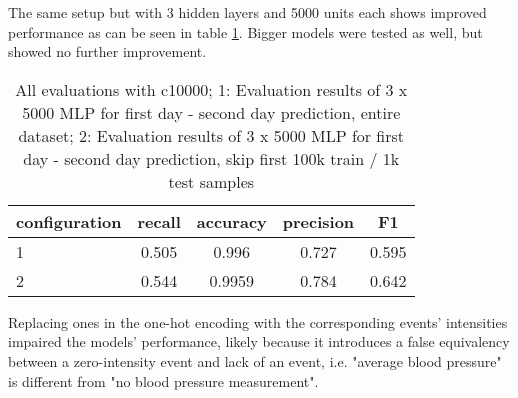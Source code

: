 
The same setup but with 3 hidden layers and 5000 units each shows improved performance as can be seen in table \ref{tab:mytable3}. Bigger models were tested as well, but showed no further improvement.


\begin{table}[H]
  \centering
    \begin{tabular}{lcccc} \toprule
        {configuration} & {recall} & {accuracy} & {precision} & {F1}  \\ \midrule
        {1}  & 0.505  & 0.996 &  0.727  & 0.595 \\
        {2} & 0.544  & 0.9959 &  0.784  & 0.642 \\  \midrule
    \end{tabular}
  \caption{All evaluations with c10000; 1: Evaluation results of 3 x 5000 MLP for first day - second day  prediction, entire dataset; 2: Evaluation results of 3 x 5000 MLP for first day - second day prediction, skip first 100k train / 1k test samples}
  \label{tab:mytable3}
\end{table}




Replacing ones in the one-hot encoding with the corresponding events' intensities impaired the models' performance, likely because it introduces a false equivalency between a zero-intensity event and lack of an event, i.e. "average blood pressure" is different from "no blood pressure measurement".



